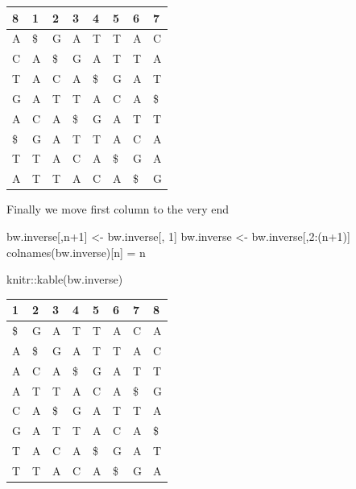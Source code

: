 \documentclass[
]{book}
\newenvironment{Shaded}{\begin{snugshade}}{\end{snugshade}}
\newcommand{\DecValTok}[1]{\textcolor[rgb]{0.00,0.00,0.81}{#1}}
\newcommand{\FunctionTok}[1]{\textcolor[rgb]{0.00,0.00,0.00}{#1}}
\newcommand{\NormalTok}[1]{#1}
\newcommand{\OtherTok}[1]{\textcolor[rgb]{0.56,0.35,0.01}{#1}}
\newcommand{\SpecialCharTok}[1]{\textcolor[rgb]{0.00,0.00,0.00}{#1}}
\begin{document}
\begin{tabular}{l|l|l|l|l|l|l|l}
\hline
8 & 1 & 2 & 3 & 4 & 5 & 6 & 7\\
\hline
A & \$ & G & A & T & T & A & C\\
\hline
C & A & \$ & G & A & T & T & A\\
\hline
T & A & C & A & \$ & G & A & T\\
\hline
G & A & T & T & A & C & A & \$\\
\hline
A & C & A & \$ & G & A & T & T\\
\hline
\$ & G & A & T & T & A & C & A\\
\hline
T & T & A & C & A & \$ & G & A\\
\hline
A & T & T & A & C & A & \$ & G\\
\hline
\end{tabular}

Finally we move first column to the very end

\begin{Shaded}
\begin{Highlighting}[numbers=left,,]
\NormalTok{bw.inverse[,n}\SpecialCharTok{+}\DecValTok{1}\NormalTok{] }\OtherTok{\textless{}{-}}\NormalTok{ bw.inverse[, }\DecValTok{1}\NormalTok{]}
\NormalTok{bw.inverse       }\OtherTok{\textless{}{-}}\NormalTok{ bw.inverse[,}\DecValTok{2}\SpecialCharTok{:}\NormalTok{(n}\SpecialCharTok{+}\DecValTok{1}\NormalTok{)]}
\FunctionTok{colnames}\NormalTok{(bw.inverse)[n] }\OtherTok{=}\NormalTok{ n}

\NormalTok{knitr}\SpecialCharTok{::}\FunctionTok{kable}\NormalTok{(bw.inverse)}
\end{Highlighting}
\end{Shaded}

\begin{tabular}{l|l|l|l|l|l|l|l}
\hline
1 & 2 & 3 & 4 & 5 & 6 & 7 & 8\\
\hline
\$ & G & A & T & T & A & C & A\\
\hline
A & \$ & G & A & T & T & A & C\\
\hline
A & C & A & \$ & G & A & T & T\\
\hline
A & T & T & A & C & A & \$ & G\\
\hline
C & A & \$ & G & A & T & T & A\\
\hline
G & A & T & T & A & C & A & \$\\
\hline
T & A & C & A & \$ & G & A & T\\
\hline
T & T & A & C & A & \$ & G & A\\
\hline
\end{tabular}
\end{document}
